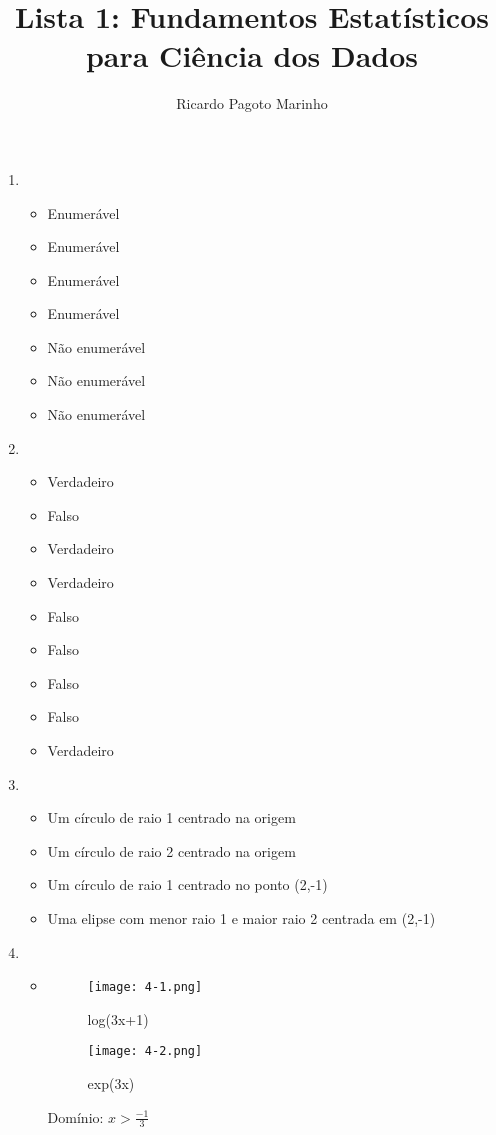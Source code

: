 \documentclass[11pt,a4paper]{book}
\title{Lista 1: Fundamentos Estatísticos para Ciência dos Dados}
\author{Ricardo Pagoto Marinho}
\begin{document}
\maketitle
	\begin{enumerate}
		\item
		\begin{itemize}
			\item Enumerável
			\item Enumerável
			\item Enumerável
			\item Enumerável
			\item Não enumerável
			\item Não enumerável
			\item Não enumerável
		\end{itemize}
		\item
		\begin{itemize}
			\item Verdadeiro
			\item Falso
			\item Verdadeiro
			\item Verdadeiro
			\item Falso
			\item Falso
			\item Falso
			\item Falso
			\item Verdadeiro
		\end{itemize}
		\item
		\begin{itemize}
			\item Um círculo de raio 1 centrado na origem
			\item Um círculo de raio 2 centrado na origem
			\item Um círculo de raio 1 centrado no ponto (2,-1)
			\item Uma elipse com menor raio 1 e maior raio 2 centrada em (2,-1)
		\end{itemize}
		\item
		\begin{itemize}
			\item
			\begin{figure}[b]
				\centering
				\texttt{[image: 4-1.png]}
				\caption{log(3x+1)}
			\end{figure}
			\begin{figure}[t]
				\centering
				\texttt{[image: 4-2.png]}
				\caption{exp(3x)}
			\end{figure}
			Domínio: $x>\frac{-1}{3}$

\end{itemize}
\end{enumerate}
\end{document}
